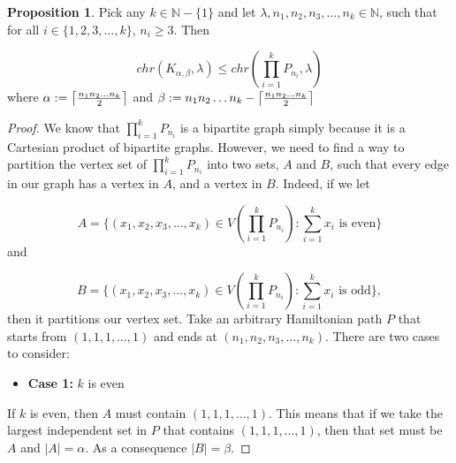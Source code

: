 \documentclass[11pt]{article}
\DeclarePairedDelimiter{\ceil}{\lceil}{\rceil}
\theoremstyle{definition}
\newcommand{\N}{{\mathbb{N}}}
\newtheorem{prop}{Proposition}
\begin{document}
\begin{prop}
Pick any $k \in \N -\{1\}$ and let $\lambda, n_1, n_2, n_3, \ldots, n_k \in \N$, such that for all $i \in \{1, 2, 3,\ldots, k\}$, $n_i \geq 3$. Then

\begin{equation}
chr(K_{\alpha, \beta}, \lambda) \leq chr(\prod_{i = 1}^{k}P_{n_{i}}, \lambda)
\end{equation} where $\alpha := \ceil*{\frac{n_{1}n_{2}\ldots n_{k}}{2}}$ and $\beta := n_{1}n_{2}\ldots n_{k} - \ceil*{\frac{n_{1}n_{2}\ldots n_{k}}{2}}$
\end{prop}

\begin{proof}
We know that $\prod_{i = 1}^{k}P_{n_{i}}$ is a bipartite graph simply because it is a Cartesian product of bipartite graphs. However, we need to find a way to partition the vertex set of $\prod_{i = 1}^{k}P_{n_{i}}$ into two sets, $A$ and $B$, such that every edge in our graph has a vertex in $A$, and a vertex in $B$.
Indeed, if we let 

\begin{equation}
A = \{ (x_1, x_2, x_3, \ldots, x_{k}) \in V(\prod_{i = 1}^{k}P_{n_{i}}): \sum_{i = 1}^{k}x_{i} \text{ is even} \} \nonumber
\end{equation} and

\begin{equation}
B = \{ (x_1, x_2, x_3, \ldots, x_{k}) \in V(\prod_{i = 1}^{k}P_{n_{i}}): \sum_{i = 1}^{k}x_{i} \text{ is odd}\}, \nonumber
\end{equation} then it partitions our vertex set. Take an arbitrary Hamiltonian path $P$ that starts from $(1, 1, 1,\ldots, 1)$ and ends at $(n_1,n_2,n_3,\ldots, n_k)$. There are two cases to consider:

\begin{itemize}
\item \textbf{Case 1: }$k$ is even
\end{itemize}If $k$ is even, then $A$ must contain $(1, 1, 1,\ldots, 1)$. This means that if we take the largest independent set in $P$ that contains $(1, 1, 1,\ldots, 1)$, then that set must be $A$ and $|A| = \alpha$. As a consequence $|B| = \beta$.


\end{proof}
\end{document}

